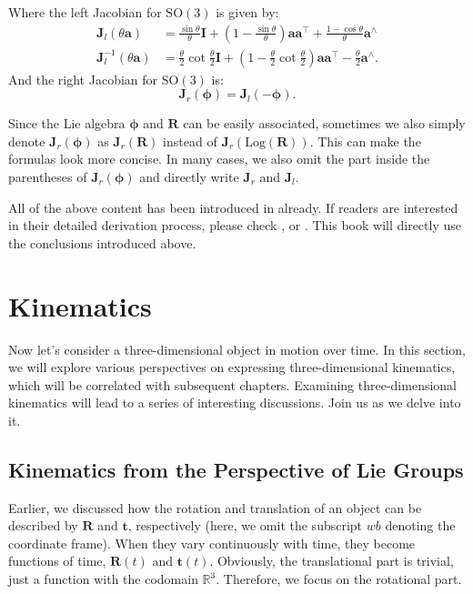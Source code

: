 Where the left Jacobian for $\mathrm{SO}(3)$ is given by:
\begin{align}
	\mathbf{J}_l (\theta \mathbf{a}) &= \frac{\sin \theta}{\theta} \mathbf{I} + (1-\frac{\sin \theta }{\theta}) \mathbf{a} \mathbf{a}^\top + \frac{1-\cos \theta}{\theta} \mathbf{a}^\wedge \\
	\mathbf{J}_l^{ - 1}(\theta \mathbf{a}) &= \frac{\theta }{2}\cot \frac{\theta }{2} \mathbf{I} + \left( {1 - \frac{\theta 
		}{2}\cot \frac{\theta }{2}} \right) \mathbf{a} {\mathbf{a}^\top} - \frac{\theta }{2}{ \mathbf{a}^ \wedge }. 
\end{align}
And the right Jacobian for $\mathrm{SO}(3)$ is:
\begin{equation}
	\mathbf{J}_r(\boldsymbol{\phi}) =\mathbf{J}_l(-\boldsymbol{\phi}) .
\end{equation}

Since the Lie algebra $\boldsymbol{\phi}$ and $\mathbf{R}$ can be easily associated, sometimes we also simply denote $\mathbf{J}_r(\boldsymbol{\phi})$ as $\mathbf{J}_r(\mathbf{R})$ instead of $\mathbf{J}_r(\mathrm{Log}(\mathbf{R}))$. This can make the formulas look more concise. In many cases, we also omit the part inside the parentheses of $\mathbf{J}_r(\boldsymbol{\phi})$ and directly write $\mathbf{J}_r$ and $\mathbf{J}_l$.

All of the above content has been introduced in \cite{Gao2017} already. If readers are interested in their detailed derivation process, please check \cite{Gao2017}, \cite{Barfoot2016} or \cite{Sola2017}. This book will directly use the conclusions introduced above.

\section{Kinematics}
Now let's consider a three-dimensional object in motion over time. In this section, we will explore various perspectives on expressing three-dimensional kinematics, which will be correlated with subsequent chapters. Examining three-dimensional kinematics will lead to a series of interesting discussions. Join us as we delve into it.

\subsection{Kinematics from the Perspective of Lie Groups}
\label{sec:so3-kinematics}
Earlier, we discussed how the rotation and translation of an object can be described by $\mathbf{R}$ and $\mathbf{t}$, respectively (here, we omit the subscript $wb$ denoting the coordinate frame). When they vary continuously with time, they become functions of time, $\mathbf{R}(t)$ and $\mathbf{t}(t)$. Obviously, the translational part is trivial, just a function with the codomain $\mathbb{R}^3$. Therefore, we focus on the rotational part.

